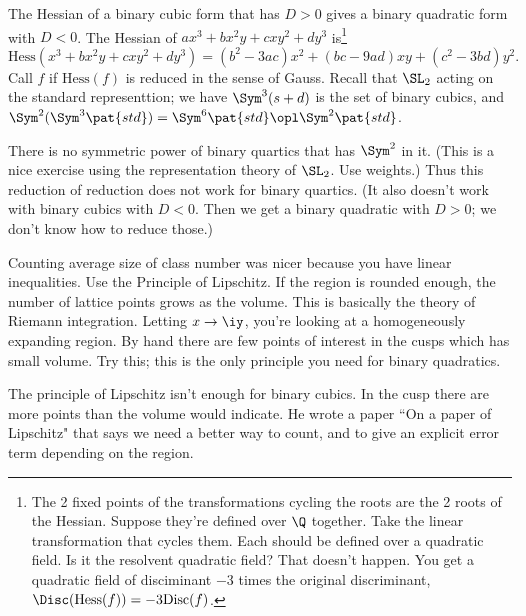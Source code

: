 The Hessian of a binary cubic form that has $D>0$ gives a binary quadratic form with $D<0$. The Hessian of $ax^3+bx^2y+cxy^2+dy^3$ is\footnote{The 2 fixed points of the transformations cycling the roots are the 2 roots of the Hessian. Suppose they're defined over $\Q$ together. Take the linear transformation that cycles them. Each should be defined over a quadratic field. Is it the resolvent quadratic field? That doesn't happen. You get a quadratic field of disciminant $-3$ times the original discriminant, $\Disc(\text{Hess}(f))=-3\text{Disc}(f)$.}
\[
\text{Hess}(x^3+bx^2y+cxy^2+dy^3) = (b^2-3ac)x^2 + (bc-9ad)xy + (c^2-3bd)y^2.
\]
Call $f$  if $\text{Hess}(f)$ is reduced in the sense of Gauss.
Recall that $\SL_2$ acting on the standard representtion; we have $\Sym^3(s+d)$ is the set of binary cubics, and $\Sym^2(\Sym^3\pat{std})=\Sym^6\pat{std}\opl\Sym^2\pat{std}$.

There is no symmetric power of binary quartics that has $\Sym^2$ in it. (This is a nice exercise using the representation theory of $\SL_2$. Use weights.) Thus this reduction of reduction does not work for binary quartics. (It also doesn't work with binary cubics with $D<0$. Then we get a binary quadratic with $D>0$; we don't know how to reduce those.)

Counting average size of class number was nicer because you have linear inequalities. Use the Principle of Lipschitz. If the region is rounded enough, the number of lattice points grows as the volume. This is basically the theory of Riemann integration. %
 Letting $x\to \iy$, you're looking at a homogeneously expanding region. By hand there are few points of interest in the cusps which has small volume. Try this; this is the only principle you need for binary quadratics.

The principle of Lipschitz isn't enough for binary cubics. In the cusp there are more points than the volume would indicate. He wrote a paper ``On a paper of Lipschitz" that says we need a better way to count, and to give an explicit error term depending on the region. %


